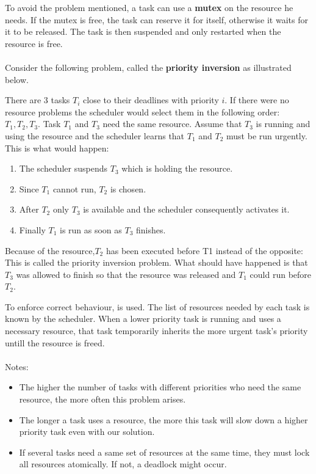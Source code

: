 \documentclass[../main.tex]{subfiles}
\begin{document}
To avoid the problem mentioned, a task can use a \textbf{mutex} on the resource he needs. If the mutex is free, the task can reserve it for itself, otherwise it waits for it to be released. The task is then suspended and only restarted when the resource is free.
\\\\
Consider the following problem, called the \textbf{priority inversion} as illustrated below.
\begin{exmp}
There are 3 tasks $T_i$ close to their deadlines with priority $i$. If there were no resource problems the scheduler would select them in the following order: $T_1, T_2, T_3$. Task $T_1$ and $T_3$ need the same resource. Assume that $T_3$ is running and using the resource and the scheduler learns that $T_1$ and $T_2$ must be run urgently. This is what would happen:
\begin{enumerate}
	\item The scheduler suspends $T_3$ which is holding the resource.
	\item Since $T_1$ cannot run, $T_2$ is chosen.
	\item After $T_2$ only $T_3$ is available and the scheduler consequently activates it.
	\item Finally $T_1$ is run as soon as $T_3$ finishes.
\end{enumerate}
Because of the resource,$T_2$ has been executed before T1 instead of the opposite: This is called the priority inversion problem. What should have happened is that $T_3$ was allowed to finish so that the resource was released and $T_1$ could run before $T_2$.
\end{exmp}
To enforce correct behaviour,  is used. The list of resources needed by each task is known by the scheduler. When a lower priority task is running and uses a necessary resource, that task temporarily inherits the more urgent task's priority untill the resource is freed.
\\\\
Notes:
\begin{itemize}
	\item The higher the number of tasks with different priorities who need the same resource, the more often this problem arises.
	\item The longer a task uses a resource, the more this task will slow down a higher priority task even with our solution.
	\item If several tasks need a same set of resources at the same time, they must lock all resources atomically. If not, a deadlock might occur.
\end{itemize}
\end{document}
